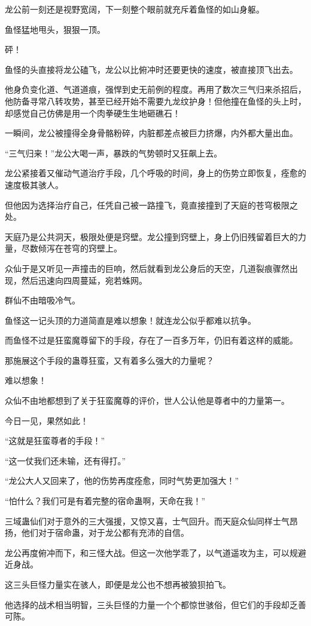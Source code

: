 \begin{this_body}
龙公前一刻还是视野宽阔，下一刻整个眼前就充斥着鱼怪的如山身躯。

鱼怪猛地甩头，狠狠一顶。

砰！

鱼怪的头直接将龙公磕飞，龙公以比俯冲时还要更快的速度，被直接顶飞出去。

他身负变化道、气道道痕，强悍到史无前例的程度。再用了数次三气归来杀招后，他防备寻常八转攻势，甚至已经开始不需要九龙纹护身！但他撞在鱼怪的头上时，却感觉自己仿佛是用一个肉拳硬生生地砸礁石！

一瞬间，龙公被撞得全身骨骼粉碎，内脏都差点被巨力挤爆，内外都大量出血。

“三气归来！”龙公大喝一声，暴跌的气势顿时又狂飙上去。

龙公紧接着又催动气道治疗手段，几个呼吸的时间，身上的伤势立即恢复，痊愈的速度极其骇人。

但他因为选择治疗自己，任凭自己被一路撞飞，竟直接撞到了天庭的苍穹极限之处。

天庭乃是公共洞天，极限处便是窍壁。龙公撞到窍壁上，身上仍旧残留着巨大的力量，尽数倾泻在苍穹的窍壁上。

众仙于是又听见一声撞击的巨响，然后就看到龙公身后的天空，几道裂痕骤然出现，然后迅速向四周蔓延，宛若蛛网。

群仙不由暗吸冷气。

鱼怪这一记头顶的力道简直是难以想象！就连龙公似乎都难以抗争。

而鱼怪不过是狂蛮魔尊留下的手段，存在了一百多万年，仍旧有着这样的威能。

那施展这个手段的蛊尊狂蛮，又有着多么强大的力量呢？

难以想象！

众仙不由地都想到了关于狂蛮魔尊的评价，世人公认他是尊者中的力量第一。

今日一见，果然如此！

“这就是狂蛮尊者的手段！”

“这一仗我们还未输，还有得打。”

“龙公大人又回来了，他的伤势再度痊愈，同时气势更加强大！”

“怕什么？我们可是有着完整的宿命蛊啊，天命在我！”

三域蛊仙们对于意外的三大强援，又惊又喜，士气回升。而天庭众仙同样士气昂扬，他们对于宿命蛊，对于龙公都有充沛的自信。

龙公再度俯冲而下，和三怪大战。但这一次他学乖了，以气道遥攻为主，可以规避近身战。

这三头巨怪力量实在骇人，即便是龙公也不想再被狼狈拍飞。

他选择的战术相当明智，三头巨怪的力量一个个都惊世骇俗，但它们的手段却乏善可陈。


\end{this_body}
